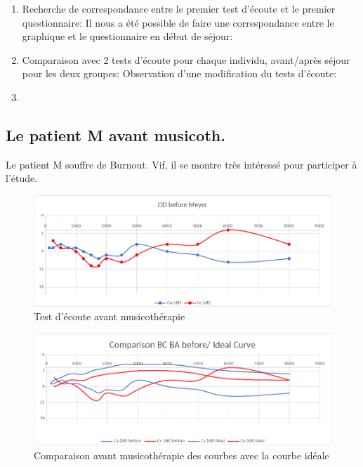         \begin{enumerate}
             
        \item Recherche de correspondance entre le premier test d'écoute et
     le premier questionnaire: Il nous a été possible de faire une
     correspondance entre le graphique et le questionnaire en début de
     séjour:


     
     
        \item Comparaison avec 2 tests d'écoute pour chaque individu,
          avant/après séjour pour les deux groupes:
          Observation d'une modification du tests d'écoute:


          
        
        \item
\end{enumerate}
	
\subsection{Le patient M avant musicoth.}

 	Le patient M souffre de Burnout. Vif, il se montre très
        intéressé pour participer à l'étude.
 
 	
 	\begin{figure}[tbh]
 		\centering
 		\includegraphics[width=0.7\linewidth]{images/clinique/od_before_meyer.png}
 		\caption{Test d'écoute avant musicothérapie}
 		\label{fig:odbeforemeyer}
 	\end{figure}
 	
 	
 	
 	
 	
 	
 	\begin{figure}
 		\centering
 		\includegraphics[width=0.7\linewidth]{images/clinique/comparison_bc_ba_before_vs_ideal_curve_meyer.png}
 		\caption[Comparaison avec la courbe idéale]{Comparaison avant
                  musicothérapie des
                  courbes  avec la courbe idéale}
 		\label{fig:comparisonbcbabeforevsidealcurvemeyer}
 	\end{figure}
 	
